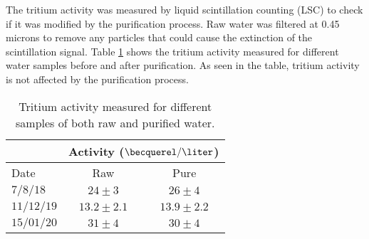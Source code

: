 The tritium activity was measured by liquid scintillation counting (LSC) to check if it was modified by the purification process. Raw water was filtered at 0.45 microns to remove any particles that could cause the extinction of the scintillation signal. Table \ref{tab:ActivityTritiumValues} shows the tritium activity measured for different water samples before and after purification. As seen in the table, tritium activity is not affected by the purification process.

\begin{table}[htbp]
\centering{}%
\begin{tabular}{lcc}
\toprule 
& \multicolumn{2}{c}{Activity ($\becquerel/\liter$)} \tabularnewline
\midrule
Date & Raw & Pure \tabularnewline
\midrule
\midrule 
$7/8/18$ & $24 \pm 3$ & $26 \pm 4$ \tabularnewline
$11/12/19$ & $13.2 \pm 2.1$ & $13.9 \pm 2.2$ \tabularnewline
$15/01/20$ & $31 \pm 4$ & $30 \pm 4$ \tabularnewline
\bottomrule
\end{tabular}
\caption{Tritium activity measured for different samples of both raw and purified water.}
\label{tab:ActivityTritiumValues}
\end{table}

